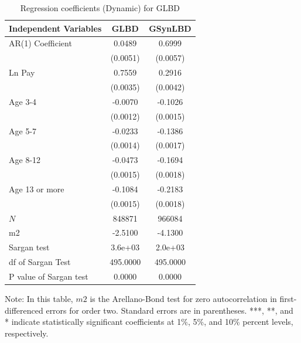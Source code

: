 \begin{table}[H]
  \centering
\caption{Regression coefficients (Dynamic) for GLBD} \label{tab:Dynamic - GMM_ger} \medskip
\renewcommand{\arraystretch}{1}
\setlength{\tabcolsep}{13pt}
\begin{tabular}{l|c |c}
\toprule
\textbf{Independent Variables}&\textbf{GLBD} &\textbf{GSynLBD}\\
\midrule
AR(1) Coefficient&   0.0489\sym{***}&   0.6999\sym{***}\\
          & (0.0051)         & (0.0057)         \\
[1em]
Ln Pay    &   0.7559\sym{***}&   0.2916\sym{***}\\
          & (0.0035)         & (0.0042)         \\
[1em]
Age 3-4   &  -0.0070\sym{***}&  -0.1026\sym{***}\\
          & (0.0012)         & (0.0015)         \\
[1em]
Age 5-7   &  -0.0233\sym{***}&  -0.1386\sym{***}\\
          & (0.0014)         & (0.0017)         \\
[1em]
Age 8-12  &  -0.0473\sym{***}&  -0.1694\sym{***}\\
          & (0.0015)         & (0.0018)         \\
[1em]
Age 13 or more&  -0.1084\sym{***}&  -0.2183\sym{***}\\
          & (0.0015)         & (0.0018)         \\
\hline
\(N\)     &   848871         &   966084         \\
m2        &  -2.5100         &  -4.1300         \\
Sargan test&  3.6e+03         &  2.0e+03         \\
df of Sargan Test& 495.0000         & 495.0000         \\
P value of Sargan test&   0.0000         &   0.0000         \\
    \bottomrule
  \end{tabular} 
\begin{tablenotes}
\small
\item Note: In this table, $m2$ is the Arellano-Bond test for zero autocorrelation in first-differenced errors for order two. Standard errors are in parentheses. ***, **, and * indicate statistically significant coefficients at 1\%, 5\%, and 10\% percent levels, respectively.
 \end{tablenotes}
\end{table}





